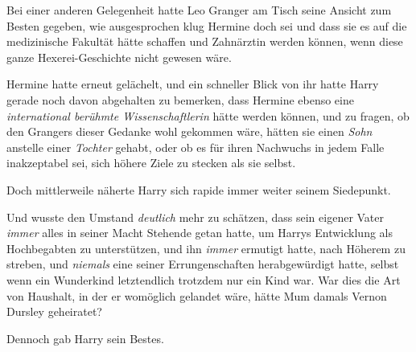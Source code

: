 Bei einer anderen Gelegenheit hatte Leo Granger am Tisch seine Ansicht zum Besten gegeben, wie ausgesprochen klug Hermine doch sei und dass sie es auf die medizinische Fakultät hätte schaffen und Zahnärztin werden können, wenn diese ganze Hexerei-Geschichte nicht gewesen wäre.

Hermine hatte erneut gelächelt, und ein schneller Blick von ihr hatte Harry gerade noch davon abgehalten zu bemerken, dass Hermine ebenso eine \emph{international berühmte Wissenschaftlerin} hätte werden können, und zu fragen, ob den Grangers dieser Gedanke wohl gekommen wäre, hätten sie einen \emph{Sohn} anstelle einer \emph{Tochter} gehabt, oder ob es für ihren Nachwuchs in jedem Falle inakzeptabel sei, sich höhere Ziele zu stecken als sie selbst.

Doch mittlerweile näherte Harry sich rapide immer weiter seinem Siedepunkt.

Und wusste den Umstand \emph{deutlich} mehr zu schätzen, dass sein eigener Vater \emph{immer} alles in seiner Macht Stehende getan hatte, um Harrys Entwicklung als Hochbegabten zu unterstützen, und ihn \emph{immer} ermutigt hatte, nach Höherem zu streben, und \emph{niemals} eine seiner Errungenschaften herabgewürdigt hatte, selbst wenn ein Wunderkind letztendlich trotzdem nur ein Kind war. War dies die Art von Haushalt, in der er womöglich gelandet wäre, hätte Mum damals Vernon Dursley geheiratet?

Dennoch gab Harry sein Bestes.

